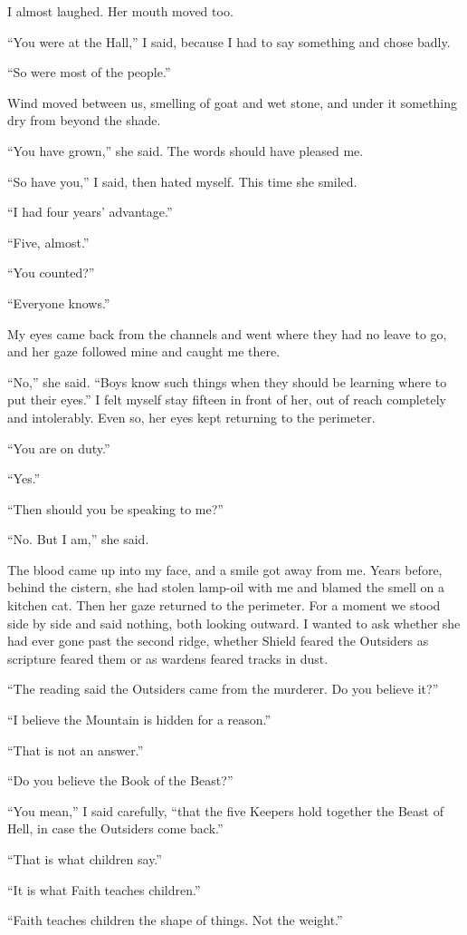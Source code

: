 I almost laughed. Her mouth moved too.\par

``You were at the Hall,'' I said, because I had to say something and chose badly.\par
``So were most of the people.''\par

Wind moved between us, smelling of goat and wet stone, and under it something dry from beyond the shade. \par

``You have grown,'' she said. The words should have pleased me. \par
``So have you,'' I said, then hated myself. This time she smiled.\par

``I had four years' advantage.''\par
``Five, almost.''\par
``You counted?''\par
``Everyone knows.'' \par

My eyes came back from the channels and went where they had no leave to go, and her gaze followed mine and caught me there.\par

``No,'' she said. ``Boys know such things when they should be learning where to put their eyes.'' I felt myself stay fifteen in front of her, out of reach completely and intolerably. Even so, her eyes kept returning to the perimeter.\par

``You are on duty.''\par
``Yes.''\par
``Then should you be speaking to me?''\par
``No. But I am,'' she said.\par

The blood came up into my face, and a smile got away from me. Years before, behind the cistern, she had stolen lamp-oil with me and blamed the smell on a kitchen cat. Then her gaze returned to the perimeter. For a moment we stood side by side and said nothing, both looking outward. I wanted to ask whether she had ever gone past the second ridge, whether Shield feared the Outsiders as scripture feared them or as wardens feared tracks in dust. \par

``The reading said the Outsiders came from the murderer. Do you believe it?''\par
``I believe the Mountain is hidden for a reason.''\par
``That is not an answer.''\par
``Do you believe the Book of the Beast?''\par
``You mean,'' I said carefully, ``that the five Keepers hold together the Beast of Hell, in case the Outsiders come back.''\par
``That is what children say.''\par
``It is what Faith teaches children.''\par
``Faith teaches children the shape of things. Not the weight.''\par

